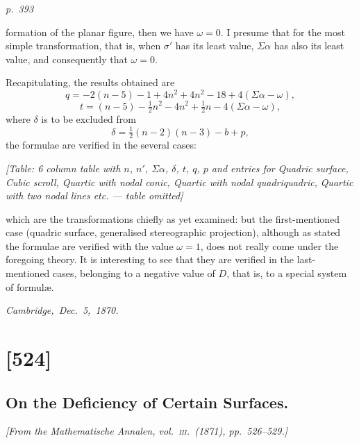 \documentclass[11pt,a4paper]{article}
\theoremstyle{plain}
\theoremstyle{definition}
\begin{document}
\clearpage

\bigskip
\textit{p.~393}
\smallskip

\noindent
formation of the planar figure, then we have $\omega = 0$. I presume that for the most
simple transformation, that is, when $\sigma'$ has its least value, $\Sigma\alpha$ has also its least value,
and consequently that $\omega = 0$.

Recapitulating, the results obtained are
\[
q = -2(n - 5) - 1 + 4n^2 + 4n^2 - 18 + 4(\Sigma\alpha - \omega),
\]
\[
t = (n - 5) - \tfrac{1}{2}n^2 - 4n^2 + \tfrac{1}{2}n - 4(\Sigma\alpha - \omega),
\]
where $\delta$ is to be excluded from
\[
\delta = \tfrac{1}{2}(n - 2)(n - 3) - b + p,
\]
the formulae are verified in the several cases:

\begin{center}
\textit{[Table: 6 column table with $n$, $n'$, $\Sigma\alpha$, $\delta$, $t$, $q$, $p$ and entries for}
\textit{Quadric surface, Cubic scroll, Quartic with nodal conic, Quartic with nodal quadriquadric,}
\textit{Quartic with two nodal lines etc. --- table omitted]}
\end{center}

which are the transformations chiefly as yet examined: but the first-mentioned case
(quadric surface, generalised stereographic projection), although as stated the formulae
are verified with the value $\omega = 1$, does not really come under the foregoing theory.
It is interesting to see that they are verified in the last-mentioned cases, belonging to a
negative value of $D$, that is, to a special system of formul\ae.

\noindent\textit{Cambridge,\ Dec.\ 5,\ 1870.}

\clearpage

\section{[524]}
\subsection{On the Deficiency of Certain Surfaces.}

\begin{center}
\textit{[From the Mathematische Annalen, vol.~\textsc{iii}.\ (1871), pp.~526--529.]}
\end{center}
\end{document}
